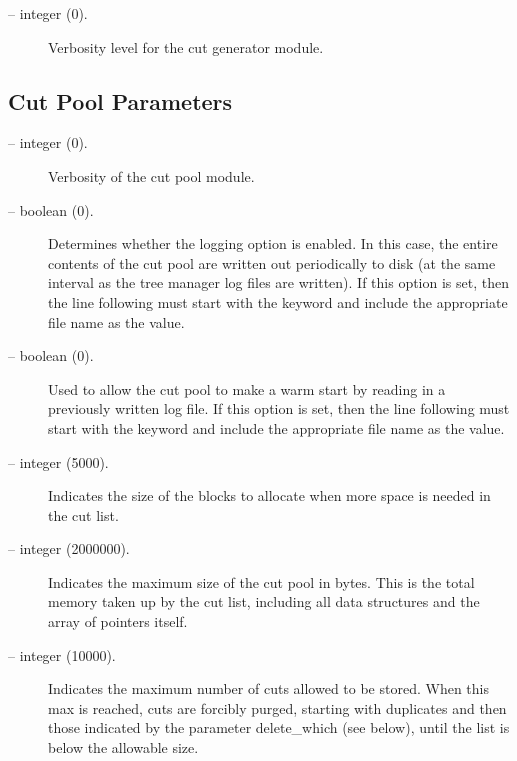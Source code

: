 \begin{description}

\item[ -- integer (0).] 
Verbosity level for the cut generator module.

\end{description}

\subsection{Cut Pool Parameters}
\label{cut_pool_params}
\begin{description}

\item[ -- integer (0).] 
Verbosity of the cut pool module.

\item[ -- boolean (0).] 
Determines whether the logging option is enabled. In this case, the
entire contents of the cut pool are written out periodically to disk
(at the same interval as the tree manager log files are written). If
this option is set, then the line following must start with the
keyword  and include the appropriate
file name as the value.

\item[ -- boolean (0).] 
Used to allow the cut pool to make a warm start by reading in a
previously written log file. If
this option is set, then the line following must start with the
keyword  and include the appropriate
file name as the value.

\item[ -- integer (5000).] 
Indicates the size of the blocks to allocate when more space is needed
in the cut list.

\item[ -- integer (2000000).] 
Indicates the maximum size of the cut pool in bytes. This is the total
memory taken up by the cut list, including all data structures and the
array of pointers itself.

\item[ -- integer (10000).] 
Indicates the maximum number of cuts allowed to be stored. When this
max is reached, cuts are forcibly purged, starting with duplicates
and then those indicated by the parameter 
{delete_which} (see below), until the list is below the allowable size.


\end{description}
